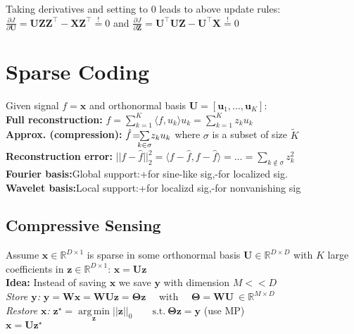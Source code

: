 \documentclass[a4paper,11pt]{article}
\newcommand{\argmin}{\operatorname*{arg\,min}}
\newcommand{\R}{\mathbb{R}}
\newcommand{\msection}[1]{\section{#1}\vspace{-0.5mm}}
\begin{document}
\begin{multicols}{2}
Taking derivatives and setting to 0 leads to above update rules:
$\frac{\partial J}{\partial \mathbf{U}} = \mathbf{U} \mathbf{Z} \mathbf{Z}^\top - \mathbf{X} \mathbf{Z}^\top \overset{!}{=} 0$ 
and 
$\frac{\partial J}{\partial \mathbf{Z}} = \mathbf{U}^\top \mathbf{U} \mathbf{Z} - \mathbf{U}^\top \mathbf{X} \overset{!}{=} 0$

\msection{Sparse Coding}
Given signal $f = \mathbf{x}$ and orthonormal basis $\mathbf{U} = [ \mathbf{u}_1, \ldots, \mathbf{u}_K]$:\\
\textbf{Full reconstruction:} 
$f = \sum \limits_{k=1}^K \langle f, u_k\rangle u_k = \sum\limits_{k=1}^K z_k u_k$\\
\textbf{Approx. (compression):} \hspace{-0.05cm}$\hat{f} \hspace{-0.05cm} = \hspace{-0.2cm}\sum \limits_{k\in \sigma} \hspace{-0.1cm} z_k u_k$ where $\sigma$ is a subset of size $\tilde K$\\
\textbf{Reconstruction error:} $||f-\hat f||_2^2 = \langle f - \hat f, f - \hat f \rangle = \ldots = \sum \limits_{k \notin \sigma} z_k^2$\\
\textbf{Fourier basis:}Global support:+for sine-like sig,-for localized sig.\\
\textbf{Wavelet basis:}Local support:+for localizd sig,-for nonvanishing sig\\
\vspace{0.1cm}

\subsection{Compressive Sensing}
Assume $\mathbf{x} \in \R^{D \times 1}$ is sparse in some orthonormal basis $\textbf{U} \in \R^{D \times D}$ with $K$ large coefficients in $\mathbf{z} \in \R^{D \times 1}$: $\mathbf x = \mathbf{U} \mathbf z$\\
\textbf{Idea:} Instead of saving $\mathbf{x}$ we save $\mathbf{y}$ with dimension $M << D$\\
\emph{Store $\mathbf{y}$:} \hspace{0.61cm}$ \mathbf y = \mathbf W \mathbf x = \mathbf W \mathbf U \mathbf z = \mathbf \Theta \mathbf z \quad$ with $\quad \mathbf \Theta = \mathbf W \mathbf U \ \in \R^{M\times D}$\\

\emph{Restore $\mathbf x$:} \hspace{0.03cm}
$\mathbf{z}^\star = \argmin \limits_{\mathbf{z}} ||\mathbf{z}||_0 \qquad \text{s.t.}\ \mathbf \Theta \mathbf z = \mathbf y$ \hspace{0.5cm}(use MP)\\
\hspace{1.8cm} $\mathbf{x} = \mathbf{U} \mathbf{z}^\star$


\end{multicols}
\end{document}
